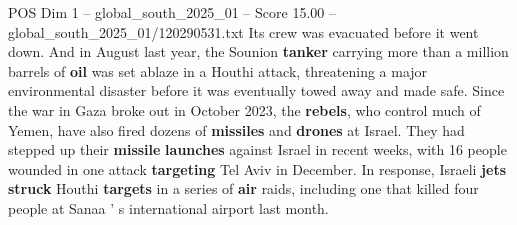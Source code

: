 \begin{textsample}{POS Dim 1 – global\_south\_2025\_01 – Score 15.00 – global\_south\_2025\_01/120290531.txt}
Its crew was evacuated before it went down.
And in August last year, the Sounion \textbf{tanker} carrying more than a million barrels of \textbf{oil} was set ablaze in a Houthi attack, threatening a major environmental disaster before it was eventually towed away and made safe.
Since the war in Gaza broke out in October 2023, the \textbf{rebels}, who control much of Yemen, have also fired dozens of \textbf{missiles} and \textbf{drones} at Israel.
They had stepped up their \textbf{missile} \textbf{launches} against Israel in recent weeks, with 16 people wounded in one attack \textbf{targeting} Tel Aviv in December.
In response, Israeli \textbf{jets} \textbf{struck} Houthi \textbf{targets} in a series of \textbf{air} raids, including one that killed four people at Sanaa ' s international airport last month.

\end{textsample}
